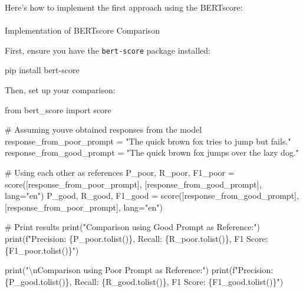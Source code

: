 \documentclass[
]{agujournal2019}
\makeatletter
\let\oldparagraph\paragraph
\renewcommand{\paragraph}{
    \@ifstar
      \xxxParagraphStar
      \xxxParagraphNoStar
  }
\newcommand{\xxxParagraphStar}[1]{\oldparagraph*{#1}\mbox{}}
\newcommand{\xxxParagraphNoStar}[1]{\oldparagraph{#1}\mbox{}}
\newenvironment{Shaded}{\begin{snugshade}}{\end{snugshade}}
\newcommand{\BuiltInTok}[1]{\textcolor[rgb]{0.00,0.23,0.31}{#1}}
\newcommand{\CharTok}[1]{\textcolor[rgb]{0.13,0.47,0.30}{#1}}
\newcommand{\CommentTok}[1]{\textcolor[rgb]{0.37,0.37,0.37}{#1}}
\newcommand{\ExtensionTok}[1]{\textcolor[rgb]{0.00,0.23,0.31}{#1}}
\newcommand{\ImportTok}[1]{\textcolor[rgb]{0.00,0.46,0.62}{#1}}
\newcommand{\NormalTok}[1]{\textcolor[rgb]{0.00,0.23,0.31}{#1}}
\newcommand{\OperatorTok}[1]{\textcolor[rgb]{0.37,0.37,0.37}{#1}}
\newcommand{\SpecialCharTok}[1]{\textcolor[rgb]{0.37,0.37,0.37}{#1}}
\newcommand{\SpecialStringTok}[1]{\textcolor[rgb]{0.13,0.47,0.30}{#1}}
\newcommand{\StringTok}[1]{\textcolor[rgb]{0.13,0.47,0.30}{#1}}
\makeatother
\begin{document}
Here's how to implement the first approach using the BERTscore:

\paragraph{Implementation of BERTscore
Comparison}\label{implementation-of-bertscore-comparison}

First, ensure you have the \texttt{bert-score} package installed:

\begin{Shaded}
\begin{Highlighting}[]
\ExtensionTok{pip}\NormalTok{ install bert{-}score}
\end{Highlighting}
\end{Shaded}

Then, set up your comparison:

\begin{Shaded}
\begin{Highlighting}[]
\ImportTok{from}\NormalTok{ bert\_score }\ImportTok{import}\NormalTok{ score}

\CommentTok{\# Assuming you\textquotesingle{}ve obtained responses from the model}
\NormalTok{response\_from\_poor\_prompt }\OperatorTok{=} \StringTok{"The quick brown fox tries to jump but fails."}
\NormalTok{response\_from\_good\_prompt }\OperatorTok{=} \StringTok{"The quick brown fox jumps over the lazy dog."}

\CommentTok{\# Using each other as references}
\NormalTok{P\_poor, R\_poor, F1\_poor }\OperatorTok{=}\NormalTok{ score([response\_from\_poor\_prompt], [response\_from\_good\_prompt], lang}\OperatorTok{=}\StringTok{"en"}\NormalTok{)}
\NormalTok{P\_good, R\_good, F1\_good }\OperatorTok{=}\NormalTok{ score([response\_from\_good\_prompt], [response\_from\_poor\_prompt], lang}\OperatorTok{=}\StringTok{"en"}\NormalTok{)}

\CommentTok{\# Print results}
\BuiltInTok{print}\NormalTok{(}\StringTok{"Comparison using Good Prompt as Reference:"}\NormalTok{)}
\BuiltInTok{print}\NormalTok{(}\SpecialStringTok{f"Precision: }\SpecialCharTok{\{}\NormalTok{P\_poor}\SpecialCharTok{.}\NormalTok{tolist()}\SpecialCharTok{\}}\SpecialStringTok{, Recall: }\SpecialCharTok{\{}\NormalTok{R\_poor}\SpecialCharTok{.}\NormalTok{tolist()}\SpecialCharTok{\}}\SpecialStringTok{, F1 Score: }\SpecialCharTok{\{}\NormalTok{F1\_poor}\SpecialCharTok{.}\NormalTok{tolist()}\SpecialCharTok{\}}\SpecialStringTok{"}\NormalTok{)}

\BuiltInTok{print}\NormalTok{(}\StringTok{"}\CharTok{\textbackslash{}n}\StringTok{Comparison using Poor Prompt as Reference:"}\NormalTok{)}
\BuiltInTok{print}\NormalTok{(}\SpecialStringTok{f"Precision: }\SpecialCharTok{\{}\NormalTok{P\_good}\SpecialCharTok{.}\NormalTok{tolist()}\SpecialCharTok{\}}\SpecialStringTok{, Recall: }\SpecialCharTok{\{}\NormalTok{R\_good}\SpecialCharTok{.}\NormalTok{tolist()}\SpecialCharTok{\}}\SpecialStringTok{, F1 Score: }\SpecialCharTok{\{}\NormalTok{F1\_good}\SpecialCharTok{.}\NormalTok{tolist()}\SpecialCharTok{\}}\SpecialStringTok{"}\NormalTok{)}
\end{Highlighting}
\end{Shaded}
\end{document}
